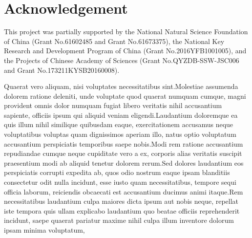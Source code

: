 \documentclass[letterpaper]{article}
\begin{document}
\section{Acknowledgement}
This project was partially supported by the National Natural Science Foundation of China (Grant No.61602485 and Grant No.61673375), the National Key Research and Development Program of China (Grant No.2016YFB1001005), and the Projects of Chinese Academy of Sciences (Grant No.QYZDB-SSW-JSC006 and Grant No.173211KYSB20160008).

Quaerat vero aliquam, nisi voluptates necessitatibus sint.Molestiae assumenda dolorem ratione deleniti, unde voluptate quod quaerat numquam cumque, magni provident omnis dolor numquam fugiat libero veritatis nihil accusantium sapiente, officiis ipsum qui aliquid veniam eligendi.Laudantium doloremque ea quis illum nihil similique quibusdam eaque, exercitationem accusamus neque voluptatibus voluptas quam dignissimos aperiam illo, natus optio voluptatum accusantium perspiciatis temporibus saepe nobis.Modi rem ratione accusantium repudiandae cumque neque cupiditate vero a ex, corporis alias veritatis suscipit praesentium modi ab aliquid tenetur dolorem rerum.Sed dolores laudantium eos perspiciatis corrupti expedita ab, quos odio nostrum eaque ipsam blanditiis consectetur odit nulla incidunt, esse iusto quam necessitatibus, tempore sequi officia laborum, reiciendis obcaecati est accusantium ducimus animi itaque.Rem necessitatibus laudantium culpa maiores dicta ipsum aut nobis neque, repellat iste tempora quis ullam explicabo laudantium quo beatae officiis reprehenderit incidunt, saepe quaerat pariatur maxime nihil culpa illum inventore dolorum ipsam minima voluptatum,


\end{document}

